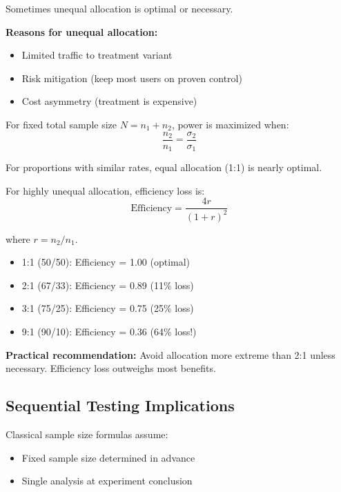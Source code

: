 Sometimes unequal allocation is optimal or necessary.

\textbf{Reasons for unequal allocation:}
\begin{itemize}
    \item Limited traffic to treatment variant
    \item Risk mitigation (keep most users on proven control)
    \item Cost asymmetry (treatment is expensive)
\end{itemize}

\begin{theorem}
For fixed total sample size $N = n_1 + n_2$, power is maximized when:
\begin{equation}
\frac{n_2}{n_1} = \frac{\sigma_2}{\sigma_1}
\end{equation}

For proportions with similar rates, equal allocation (1:1) is nearly optimal.

For highly unequal allocation, efficiency loss is:
\begin{equation}
\text{Efficiency} = \frac{4r}{(1+r)^2}
\end{equation}

where $r = n_2/n_1$.
\end{theorem}

\begin{example}
\begin{itemize}
    \item 1:1 (50/50): Efficiency = 1.00 (optimal)
    \item 2:1 (67/33): Efficiency = 0.89 (11\% loss)
    \item 3:1 (75/25): Efficiency = 0.75 (25\% loss)
    \item 9:1 (90/10): Efficiency = 0.36 (64\% loss!)
\end{itemize}

\textbf{Practical recommendation:} Avoid allocation more extreme than 2:1 unless necessary. Efficiency loss outweighs most benefits.
\end{example}

\subsection{Sequential Testing Implications}

Classical sample size formulas assume:
\begin{itemize}
    \item Fixed sample size determined in advance
    \item Single analysis at experiment conclusion
\end{itemize}

